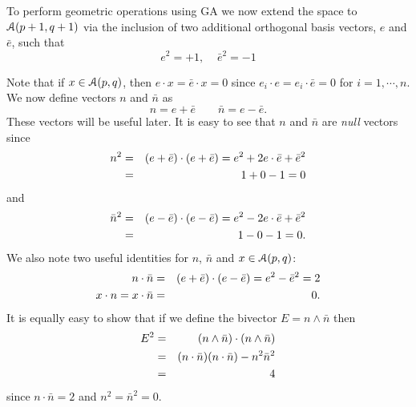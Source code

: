 To perform geometric operations using GA we now extend the space 
to ${\mathcal{A}}(p+1,q+1)$ via the inclusion of two additional orthogonal
basis  vectors, $e$ and
$\bar{e}$, such that
%
\[  e^2=+1,\;\;\;\; \bar{e}^2= -1
\]
%

Note that if $x \in {\mathcal{A}}(p,q)$, then $e\cdot x =
\bar{e}\cdot x = 0$ since $e_i\cdot e=e_i \cdot \bar{e} = 0$
for $i=1,\cdots,n$. We now define vectors $n$ and
$\bar{n}$ as
%
\[ n = e + \bar{e}  \qquad  \bar{n} = e - \bar{e}.
\label{nequations}
\]
These vectors will be useful later. It is easy to see that
$n$ and $\bar{n}$ are \emph{null} vectors since
%
\begin{eqnarray}
n^2  & = & (e + \bar{e})\cdot(e + \bar{e}) = e^2 + 2e\cdot\bar{e} + \bar{e}^2 \nonumber \\
       & = &  1 + 0 - 1 = 0  \nonumber
\end{eqnarray}
and
\begin{eqnarray}
\bar{n}^2  & = & (e - \bar{e})\cdot(e - \bar{e}) = e^2 - 2e\cdot\bar{e} + \bar{e}^2 \nonumber \\
       & = &  1 - 0 - 1 = 0.     \nonumber
\end{eqnarray}
%
We also note two useful identities for $n$, $\bar{n}$ and $x \in \mathcal{A}(p,q)$:
%
\begin{eqnarray}
n\cdot\bar{n} & = & (e + \bar{e})\cdot(e - \bar{e}) = e^2 - \bar{e}^2 = 2 \nonumber \\
x\cdot n = x\cdot \bar{n} & = & 0. \nonumber 
\end{eqnarray}
%
It is equally easy to show that if we define the bivector $E = n \wedge \bar{n}$ 
then
%
\begin{eqnarray}
  E^2 & = &  (n\wedge \bar{n})\cdot(n\wedge \bar{n}) \nonumber \\
  & = &  (n\cdot\bar{n})(n\cdot\bar{n}) - n^2 \bar{n}^2 \nonumber \\
  & = &  4
  \end{eqnarray}
since $n\cdot\bar{n}=2$ and $n^2=\bar{n}^2=0$.


